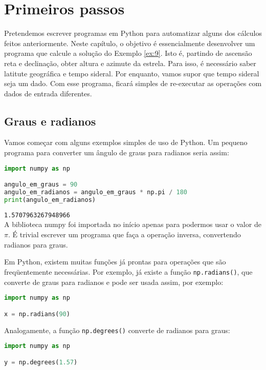 \chapter{Primeiros passos}

Pretendemos escrever programas em Python para automatizar alguns dos cálculos feitos anteriormente. Neste capítulo, o objetivo é essencialmente desenvolver um programa que calcule a solução do Exemplo \ref{ex:9}. Isto é, partindo de ascensão reta e declinação, obter altura e azimute da estrela. Para isso, é necessário saber latitute geográfica e tempo sideral. Por enquanto, vamos supor que tempo sideral seja um dado. Com esse programa, ficará simples de re-executar as operações com dados de entrada diferentes.

\section{Graus e radianos}

Vamos começar com alguns exemplos simples de uso de Python. Um pequeno programa para converter um ângulo de graus para radianos seria assim:

\begin{lstlisting}[language=Python]
import numpy as np

angulo_em_graus = 90
angulo_em_radianos = angulo_em_graus * np.pi / 180
print(angulo_em_radianos)
\end{lstlisting}

\noindent\texttt{1.5707963267948966}\\

\noindent A biblioteca numpy foi importada no início apenas para podermos usar o valor de $\pi$. É trivial escrever um programa que faça a operação inversa, convertendo radianos para graus.

Em Python, existem muitas funções já prontas para operações que são freqüentemente necessárias. Por exemplo, já existe a função \texttt{np.radians()}, que converte de graus para radianos e pode ser usada assim, por exemplo:

\begin{lstlisting}[language=Python]
import numpy as np

x = np.radians(90)
\end{lstlisting}

\noindent Analogamente, a função \texttt{np.degrees()} converte de radianos para graus:

\begin{lstlisting}[language=Python]
import numpy as np

y = np.degrees(1.57)
\end{lstlisting}


